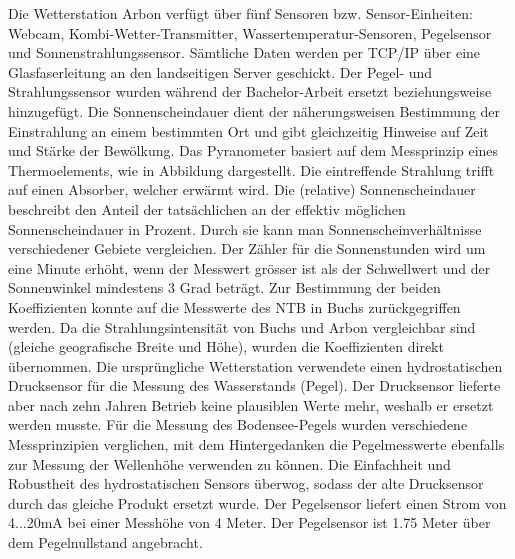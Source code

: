 \documentclass[11pt]{article}
\begin{document}
\begin{multicols}{2}
Die Wetterstation Arbon verfügt über fünf Sensoren bzw. Sensor-Einheiten: Webcam, Kombi-Wetter-Transmitter, Wassertemperatur-Sensoren, Pegelsensor und Sonnenstrahlungssensor. Sämtliche Daten werden per TCP/IP über eine Glasfaserleitung an den landseitigen Server geschickt. Der Pegel- und Strahlungssensor wurden während der Bachelor-Arbeit ersetzt beziehungsweise hinzugefügt.
Die Sonnenscheindauer dient der näherungsweisen Bestimmung der Einstrahlung an einem bestimmten Ort und gibt gleichzeitig Hinweise auf Zeit und Stärke der Bewölkung.
Das Pyranometer basiert auf dem Messprinzip eines Thermoelements, wie in Abbildung dargestellt. Die eintreffende Strahlung trifft auf einen Absorber, welcher erwärmt wird. Die (relative) Sonnenscheindauer beschreibt den Anteil der tatsächlichen an der effektiv möglichen Sonnenscheindauer in Prozent. Durch sie kann man Sonnenscheinverhältnisse verschiedener Gebiete vergleichen. Der Zähler für die Sonnenstunden wird um eine Minute erhöht, wenn der Messwert grösser ist als der Schwellwert und der Sonnenwinkel mindestens 3 Grad beträgt. Zur Bestimmung der beiden Koeffizienten konnte auf die Messwerte des NTB in Buchs zurückgegriffen werden. Da die Strahlungsintensität von Buchs und Arbon vergleichbar sind (gleiche geografische Breite und Höhe), wurden die Koeffizienten direkt übernommen. Die ursprüngliche Wetterstation verwendete einen hydrostatischen Drucksensor für die Messung des Wasserstands (Pegel). Der Drucksensor lieferte aber nach zehn Jahren Betrieb keine plausiblen Werte mehr, weshalb er ersetzt werden musste. Für die Messung des Bodensee-Pegels wurden verschiedene Messprinzipien verglichen, mit dem Hintergedanken die Pegelmesswerte ebenfalls zur Messung der Wellenhöhe verwenden zu können. Die Einfachheit und Robustheit des hydrostatischen Sensors überwog, sodass der alte Drucksensor durch das gleiche Produkt ersetzt wurde. Der Pegelsensor liefert einen Strom von 4...20mA bei einer Messhöhe von 4 Meter. Der Pegelsensor ist 1.75 Meter über dem Pegelnullstand angebracht.

\end{multicols}
\end{document}

